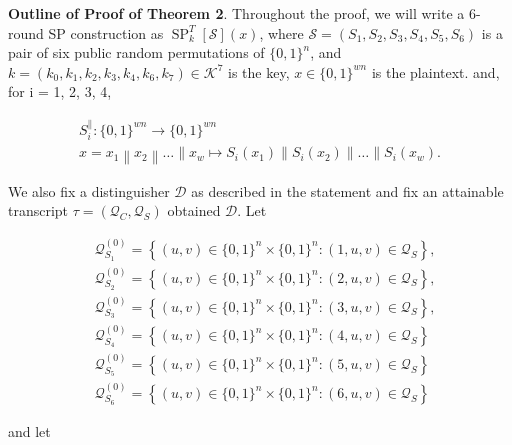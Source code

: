 \noindent \textbf{Outline of Proof of Theorem 2}. Throughout the proof, we will write a 6-round SP construction as $\operatorname{SP}^T_{k}[\mathcal{S}](x)$, where $\mathcal{S}=(S_1, S_2, S_3, S_4, S_5, S_6)$  is a pair of six public random permutations of $\{0,1\}^{n}$, and $k = (k_{0}, k_{1}, k_{2}, k_{3}, k_{4}, k_{6}, k_{7}) \in \mathcal{K}^{7}$ is the key, $x \in \{0,1\}^{w n}$ is the plaintext. and, for i = 1, 2, 3, 4,

$$
\begin{array}{c}
{S_{i}^{\|}:\{0,1\}^{w n} \rightarrow\{0,1\}^{w n}} \\
{x=x_{1}\left\|x_{2}\right\| \ldots\left\|x_{w} \longmapsto S_{i}\left(x_{1}\right)\right\| S_{i}\left(x_{2}\right)\|\ldots\| S_{i}\left(x_{w}\right)}.
\end{array}
$$

We also fix a distinguisher $\mathcal{D}$ as described in the statement and fix an attainable transcript $\tau =\left(\mathcal{Q}_{C}, \mathcal{Q}_{S}\right)$ obtained $\mathcal{D}$. Let

$$
\begin{aligned}
&\mathcal{Q}_{S_{1}}^{(0)}=\left\{(u, v) \in\{0,1\}^{n} \times\{0,1\}^{n}:(1, u, v) \in \mathcal{Q}_{S} \right\},\\
&\mathcal{Q}_{S_{2}}^{(0)}=\left\{(u, v) \in\{0,1\}^{n} \times\{0,1\}^{n}:(2, u, v) \in \mathcal{Q}_{S} \right\},\\
&\mathcal{Q}_{S_{3}}^{(0)}=\left\{(u, v) \in\{0,1\}^{n} \times\{0,1\}^{n}:(3, u, v) \in \mathcal{Q}_{S} \right\},\\
&\mathcal{Q}_{S_{4}}^{(0)}=\left\{(u, v) \in\{0,1\}^{n} \times\{0,1\}^{n}:(4, u, v) \in \mathcal{Q}_{S} \right\}\\
&\mathcal{Q}_{S_{5}}^{(0)}=\left\{(u, v) \in\{0,1\}^{n} \times\{0,1\}^{n}:(5, u, v) \in \mathcal{Q}_{S} \right\}\\
&\mathcal{Q}_{S_{6}}^{(0)}=\left\{(u, v) \in\{0,1\}^{n} \times\{0,1\}^{n}:(6, u, v) \in \mathcal{Q}_{S} \right\}
\end{aligned}
$$

\noindent and let

